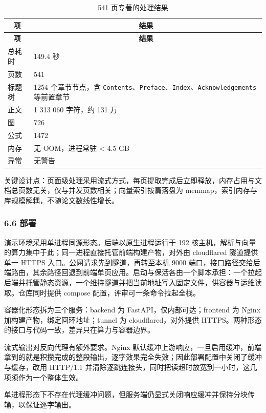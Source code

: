 \documentclass[UTF8,fontset=windows,zihao=5,a4paper]{ctexart}
\begin{document}
\begin{longtable}{@{}p{}p{}@{}}
\caption{541 页专著的处理结果}\\
\toprule
\multicolumn{1}{c}{\textbf{项}} & \multicolumn{1}{c}{\textbf{结果}} \\
\midrule
\endfirsthead
\toprule
\multicolumn{1}{c}{\textbf{项}} & \multicolumn{1}{c}{\textbf{结果}} \\
\midrule
\endhead
\bottomrule
\endfoot
总耗时 & 149.4 秒 \\
页数 & 541 \\
标题树 & 1254 个章节节点，含 \texttt{Contents}、\texttt{Preface}、\texttt{Index}、\texttt{Acknowledgements} 等前置章节 \\
正文 & 1 313 060 字符，约 131 万 \\
图 & 726 \\
公式 & 1472 \\
内存 & 无 OOM，进程常驻 < 4.5 GB \\
异常 & 无警告 \\
\end{longtable}

关键设计点：页面级处理采用流式方式，每页提取完成后立即释放，内存占用与文档总页数无关，仅与并发页数相关；向量索引按篇落盘为 memmap，索引内存与库规模解耦，不随论文数线性增长。

\subsubsection*{6.6 部署}
演示环境采用单进程同源形态。后端以原生进程运行于 192 核主机，解析与向量的算力集中于此；同一进程直接托管前端构建产物，对外由 cloudflared 隧道提供单一 HTTPS 入口。公网请求先到隧道，再转至本机 9000 端口，接口路径交给后端路由，其余路径回退到前端单页应用。启动与保活各由一个脚本承担：一个拉起后端并托管静态资源，一个维持隧道并把当前地址写入固定文件，供容器与运维读取。仓库同时提供 compose 配置，评审可一条命令拉起全栈。

容器化形态拆为三个服务：backend 为 FastAPI，仅内部可达；frontend 为 Nginx 加构建产物，绑定回环地址；tunnel 为 cloudflared，对外提供 HTTPS。两种形态的接口与代码一致，差异只在算力与容器边界。

流式输出对反向代理有额外要求。Nginx 默认缓冲上游响应，一旦启用缓冲，前端拿到的就是积攒完成的整段输出，逐字效果完全失效；因此部署配置中关闭了缓冲与缓存，改用 HTTP/1.1 并清除逐跳连接头，同时把读超时放宽到一小时，这几项须作为一个整体生效。

单进程形态下不存在代理缓冲问题，但服务端仍显式关闭响应缓冲并保持分块传输，以保证逐字输出。
\end{document}
